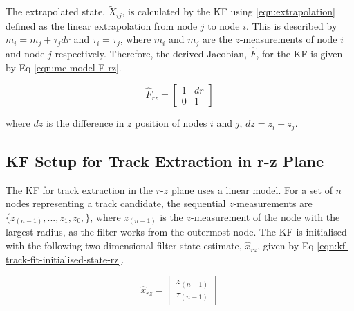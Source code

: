 
The extrapolated state, $\widetilde{X}_{ij}$, is calculated by the KF using \eqref{eqn:extrapolation} defined as the linear extrapolation from node $j$ to node $i$. This is described by $m_i = m_j + \tau_j dr$ and $\tau_i = \tau_j$, where $m_i$ and $m_j$ are the $z$-measurements of node $i$ and node $j$ respectively. Therefore, the derived Jacobian, $\hat{F}$, for the KF is given by Eq \eqref{eqn:mc-model-F-rz}.


\begin{equation}
\hat{F}_{rz} = \begin{bmatrix} 1 & dr \\ 0 & 1 \end{bmatrix}
\label{eqn:mc-model-F-rz}
\end{equation}

where $dz$ is the difference in $z$ position of nodes $i$ and $j$, $dz = z_i - z_j$.






\subsection{KF Setup for Track Extraction in r-z Plane}
\label{chapter-6-end-of-derivation}

The KF for track extraction in the $r$-$z$ plane uses a linear model. For a set of $n$ nodes representing a track candidate, the sequential $z$-measurements are $\{z_{(n-1)}, ..., z_1, z_0, \}$, where $z_{(n-1)}$ is the $z$-measurement of the node with the largest radius, as the filter works from the outermost node. The KF is initialised with the following two-dimensional filter state estimate, $\hat{x}_{rz}$, given by Eq \eqref{eqn:kf-track-fit-initialised-state-rz}.

\begin{equation}
\hat{x}_{rz} = \begin{bmatrix} z_{(n-1)} \\ \tau_{(n-1)} \end{bmatrix} 
\label{eqn:kf-track-fit-initialised-state-rz}
\end{equation}


